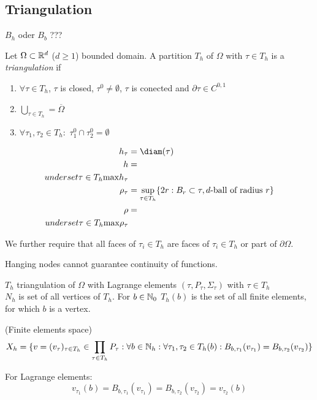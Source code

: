 \subsection{Triangulation}

\Large{ $B_h$ oder $B_b$ ???}

\begin{definition_}
	Let $\Omega \subset \mathbb{R}^d$ ($d \geq 1$) bounded domain. A partition $T_h$ of $\Omega$ with $\tau \in T_h$ is a \textit{triangulation} if
	\begin{enumerate}[label=\alph*)]
		\item $\forall \tau \in T_h$, $\tau$ is closed, $\tau^0 \neq \emptyset$, $\tau$ is conected and $\partial \tau \in C^{0,1}$
		
		\item $\bigcup \limits_{\tau \in T_h} = \overline{\Omega}$
		
		\item $\forall \tau_1,\tau_2 \in T_h:$ $\tau^0_1\cap \tau^0_2 = \emptyset$
	\end{enumerate}

	\begin{align*}
		h_{\tau} &= \diam (\tau)\\
		h &= \\underset{\tau \in T_h}{\max} h_{\tau}\\
		\rho_{\tau} &= \underset{\tau \in T_h}{\sup} \{2r: B_r \subset \tau, d\text{-ball of radius  }r \} \\
		\rho &= \\underset{\tau \in T_h}{\max} \rho_{\tau}\\
	\end{align*}
\end{definition_}

We further require that all faces of $\tau_i \in T_h$ are faces of $\tau_i \in T_h$ or part of $\partial \Omega$.

Hanging nodes cannot guarantee continuity of functions.

$T_h$ triangulation of $\Omega$ with Lagrange elements $(\tau,P_\tau,\Sigma_\tau)$ with $\tau \in T_h$\\
$ N_h$ is set of all vertices of $T_h$. For $b\in \mathbb{N}_0 $ $T_h(b) $ is the set of all finite elements, for which $b$ is a vertex.

\begin{definition_}
	(Finite elements space)\\
	\begin{equation*}
		X_h = \{ v = (v_\tau)_{\tau \in T_h} \in \prod \limits_{\tau \in T_h} P_\tau :  \forall b  \in\mathbb{N}_h : \forall \tau_1,\tau_2 \in T_h(b): B_{b,\tau_1}(v_{\tau_1}) = B_{b,\tau_2}(v_{\tau_2})  \}
	\end{equation*}
\end{definition_}
For Lagrange elements:
\begin{equation*}
	v_{\tau_1}(b) = B_{b,\tau_1}(v_{\tau_1}) = B_{b,\tau_2}(v_{\tau_2}) = v_{\tau_2}(b)
\end{equation*}

